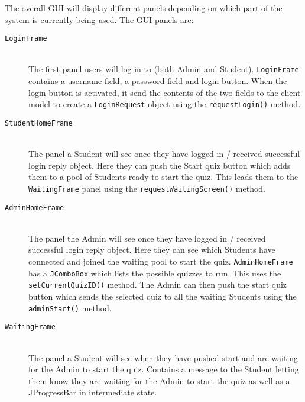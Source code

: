 \begin{enumerate}
        The overall GUI will display different panels depending on which part of
        the system is currently being used. The GUI panels are:

    \begin{description}

        \item[\texttt{LoginFrame}]\hfill \\ The first panel users will log-in
            to (both Admin and Student). \texttt{LoginFrame} contains a
            username field, a password field and login button. When the login
            button is activated, it send the contents of the two fields to the
            client model to create a \texttt{LoginRequest} object using the
            \verb+requestLogin()+ method.

        \item[\texttt{StudentHomeFrame}]\hfill \\ The panel a Student will see
            once they have logged in / received successful login reply object.
            Here they can push the Start quiz button which adds them to a pool
            of Students ready to start the quiz. This leads them to the
            \texttt{WaitingFrame} panel using the
            \verb+requestWaitingScreen()+ method.

        \item[\texttt{AdminHomeFrame}]\hfill \\ The panel the Admin will see
            once they have logged in / received successful login reply object.
            Here they can see which Students have connected and joined the
            waiting pool to start the quiz. \texttt{AdminHomeFrame} has a
            \texttt{JComboBox} which lists the possible quizzes to run. This
            uses the \verb+setCurrentQuizID()+ method. The Admin can then
            push the start quiz button which sends the selected quiz to all the
            waiting Students using the \verb+adminStart()+ method.

        \item[\texttt{WaitingFrame}]\hfill \\ The panel a Student will see when
            they have pushed start and are waiting for the Admin to start
            the quiz. Contains a message to the Student letting them know
            they are waiting for the Admin to start the quiz as well as a
            JProgressBar in intermediate state.


\end{description}
\end{enumerate}
